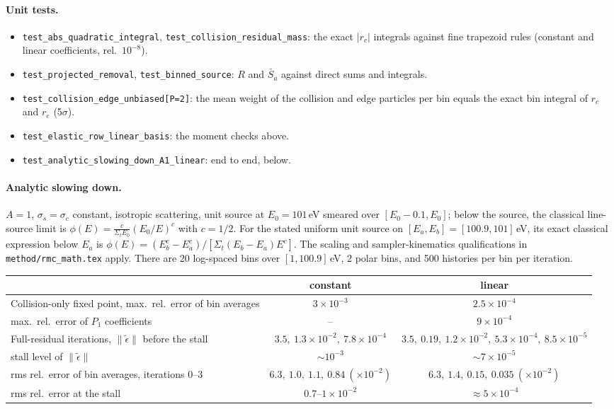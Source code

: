 \documentclass[11pt]{article}
\newcommand{\teps}{\tilde\epsilon}
\newcommand{\Sbar}{\bar S}
\newcommand{\Sigt}{\Sigma_t}
\begin{document}
\paragraph{Unit tests.}
\begin{itemize}
  \item \texttt{test\_abs\_quadratic\_integral}, \texttt{test\_collision\_residual\_mass}:
  the exact $|r_c|$ integrals against fine trapezoid rules (constant and linear
  coefficients, rel.\ $10^{-8}$).
  \item \texttt{test\_projected\_removal}, \texttt{test\_binned\_source}: $R$ and $\Sbar_a$
  against direct sums and integrals.
  \item \texttt{test\_collision\_edge\_unbiased[P=2]}: the mean weight of the collision
  and edge particles per bin equals the exact bin integral of $r_c$ and $r_e$ (5$\sigma$).
  \item \texttt{test\_elastic\_row\_linear\_basis}: the moment checks above.
  \item \texttt{test\_analytic\_slowing\_down\_A1\_linear}: end to end, below.
\end{itemize}

\paragraph{Analytic slowing down.} $A=1$, $\sigma_s=\sigma_c$ constant, isotropic
scattering, unit source at $E_0=101$\,eV smeared over $[E_0-0.1, E_0]$; below the
source, the classical line-source limit is
$\phi(E) = \tfrac{c}{\Sigt E_0}(E_0/E)^c$ with $c=1/2$.
For the stated uniform unit source on $[E_a,E_b]=[100.9,101]$\,eV, its exact
classical expression below $E_a$ is
$\phi(E)=(E_b^c-E_a^c)/[\Sigt(E_b-E_a)E^c]$.
The scaling and sampler-kinematics qualifications in \texttt{method/rmc\_math.tex} apply.
There are 20 log-spaced
bins over $[1, 100.9]$\,eV, 2 polar bins, and 500 histories per bin per iteration.

\begin{center}
\begin{tabular}{lcc}
\toprule
 & constant & linear \\
\midrule
Collision-only fixed point, max.\ rel.\ error of bin averages & $3\times10^{-3}$ & $2.5\times10^{-4}$ \\
\quad max.\ rel.\ error of $P_1$ coefficients & -- & $9\times10^{-4}$ \\
Full-residual iterations, $\|\teps\|$ before the stall
  & $3.5,\ 1.3\!\times\!10^{-2},\ 7.8\!\times\!10^{-4}$
  & $3.5,\ 0.19,\ 1.2\!\times\!10^{-2},\ 5.3\!\times\!10^{-4},\ 8.5\!\times\!10^{-5}$ \\
\quad stall level of $\|\teps\|$ & $\sim10^{-3}$ & $\sim7\times10^{-5}$ \\
\quad rms rel.\ error of bin averages, iterations 0--3
  & $6.3,\ 1.0,\ 1.1,\ 0.84\ (\times10^{-2})$
  & $6.3,\ 1.4,\ 0.15,\ 0.035\ (\times10^{-2})$ \\
\quad rms rel.\ error at the stall & $0.7$--$1\times10^{-2}$ & $\approx5\times10^{-4}$ \\
\bottomrule
\end{tabular}
\end{center}
\end{document}
